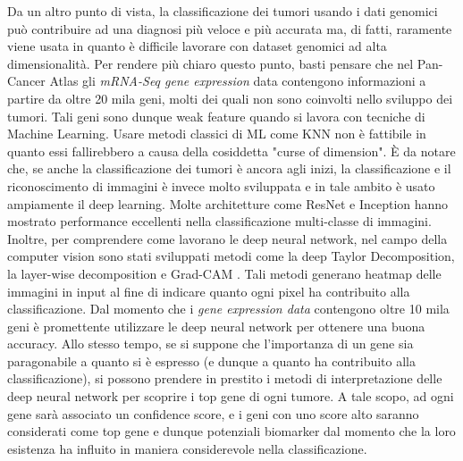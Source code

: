 Da un altro punto di vista, la classificazione dei tumori usando i dati genomici può contribuire ad una diagnosi più
veloce e più accurata ma, di fatti, raramente viene usata in quanto è difficile lavorare con dataset genomici ad alta
dimensionalità. 
Per rendere più chiaro questo punto, basti pensare che nel Pan-Cancer Atlas gli \textit{mRNA-Seq gene expression} 
data contengono informazioni a partire da oltre 20 mila geni, molti dei quali non sono coinvolti nello sviluppo dei
tumori. 
Tali geni sono dunque weak feature quando si lavora con tecniche di Machine Learning. Usare metodi classici di ML 
come KNN non è fattibile in quanto essi fallirebbero a causa della cosiddetta "curse of dimension". 
È da notare che, se anche la classificazione dei tumori è ancora agli inizi, la classificazione e il riconoscimento di
immagini è invece molto sviluppata e in tale ambito è usato ampiamente il deep learning. Molte architetture come ResNet
\cite{he2016deep} e Inception \cite{szegedy2015going} hanno mostrato performance eccellenti nella classificazione 
multi-classe di immagini.
Inoltre, per comprendere come lavorano le deep neural network, nel campo della computer vision sono stati sviluppati
metodi come la deep Taylor Decomposition, la layer-wise decomposition e Grad-CAM \cite{selvaraju2017grad}. 
Tali metodi generano heatmap delle immagini in input al fine di indicare quanto ogni pixel ha contribuito alla
classificazione.
Dal momento che i \textit{gene expression data} contengono oltre 10 mila geni è promettente utilizzare le deep neural
network per ottenere una buona accuracy. Allo stesso tempo, se si suppone che l'importanza di un gene sia paragonabile 
a quanto si è espresso (e dunque a quanto ha contribuito alla classificazione), si possono prendere in prestito i 
metodi di interpretazione delle deep neural network per scoprire i top gene di ogni tumore. 
A tale scopo, ad ogni gene sarà associato un confidence score, e i geni con uno score alto saranno considerati come top
gene e dunque potenziali biomarker dal momento che la loro esistenza ha influito in maniera considerevole nella 
classificazione.

